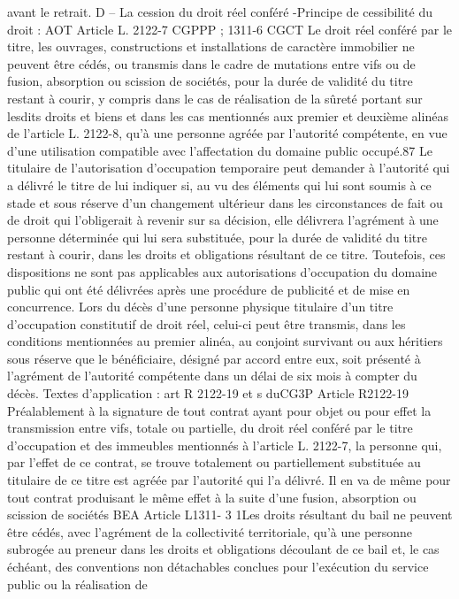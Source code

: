 \documentclass[11pt,a4paper]{report}
\begin{document}
avant le retrait.
D – La cession du droit réel conféré
-Principe de cessibilité du droit :
AOT Article L. 2122-7 CGPPP ; 1311-6 CGCT
Le droit réel conféré par le titre, les ouvrages, constructions et installations de caractère immobilier ne peuvent
être cédés, ou transmis dans le cadre de mutations entre vifs ou de fusion, absorption ou scission de sociétés,
pour la durée de validité du titre restant à courir, y compris dans le cas de réalisation de la sûreté portant sur
lesdits droits et biens et dans les cas mentionnés aux premier et deuxième alinéas de l'article L. 2122-8, qu'à une
personne agréée par l'autorité compétente, en vue d'une utilisation compatible avec l'affectation du domaine
public occupé.87
Le titulaire de l'autorisation d'occupation temporaire peut demander à l'autorité qui a délivré le titre de lui
indiquer si, au vu des éléments qui lui sont soumis à ce stade et sous réserve d'un changement ultérieur dans les
circonstances de fait ou de droit qui l'obligerait à revenir sur sa décision, elle délivrera l'agrément à une
personne déterminée qui lui sera substituée, pour la durée de validité du titre restant à courir, dans les droits et
obligations résultant de ce titre. Toutefois, ces dispositions ne sont pas applicables aux autorisations
d'occupation du domaine public qui ont été délivrées après une procédure de publicité et de mise en
concurrence.
Lors du décès d'une personne physique titulaire d'un titre d'occupation constitutif de droit réel, celui-ci peut être
transmis, dans les conditions mentionnées au premier alinéa, au conjoint survivant ou aux héritiers sous réserve
que le bénéficiaire, désigné par accord entre eux, soit présenté à l'agrément de l'autorité compétente dans un
délai de six mois à compter du décès.
Textes d’application : art R 2122-19 et s duCG3P
Article R2122-19
Préalablement à la signature de tout contrat ayant pour objet ou pour effet la transmission entre vifs, totale ou
partielle, du droit réel conféré par le titre d'occupation et des immeubles mentionnés à l'article L. 2122-7, la
personne qui, par l'effet de ce contrat, se trouve totalement ou partiellement substituée au titulaire de ce titre est
agréée par l'autorité qui l'a délivré. Il en va de même pour tout contrat produisant le même effet à la suite d'une
fusion, absorption ou scission de sociétés
BEA Article L1311- 3 1\degre  Les droits résultant du bail ne peuvent être cédés, avec l'agrément de la collectivité
territoriale, qu'à une personne subrogée au preneur dans les droits et obligations découlant de ce bail et, le cas
échéant, des conventions non détachables conclues pour l'exécution du service public ou la réalisation de
\end{document}

